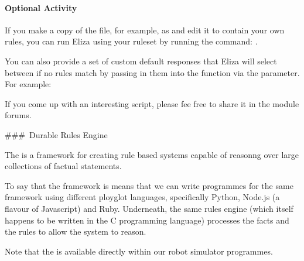 \documentclass[letterpaper,10pt,english]{sphinxmanual}
\begin{document}
\paragraph{Optional Activity}
\label{\detokenize{content/03_Robot_Lab/Section_00_04:Optional-Activity}}
If you make a copy of the  file, for example, as  and edit it to contain your own rules, you can run Eliza using your ruleset by running the command: .

You can also provide a set of custom default responses that Eliza will select between if no rules match by passing in them into the  function via the  parameter. For example:

\begin{sphinxVerbatim}[commandchars=\\\{\}]
                     \PYG{p}{[}
                              \PYG{p}{]}
\end{sphinxVerbatim}

If you come up with an interesting script, please fee free to share it in the module forums.

\#\#\# Durable Rules Engine

The  is a  framework for creating rule based systems capable of reasonng over large collections of factual statements.

To say that the framework is  means that we can write programmes for the same framework using different ployglot languages, specifically Python, Node.js (a flavour of Javascript) and Ruby. Underneath, the same rules engine (which itself happens to be written in the C programming language) processes the facts and the rules to allow the system to reason.

Note that the  is  available directly within our robot simulator programmes.
\end{document}
